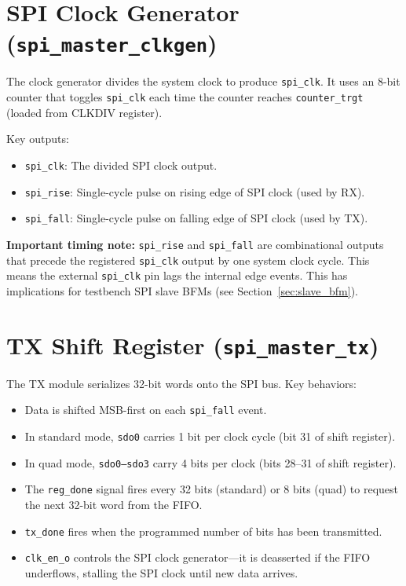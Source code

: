 \section{SPI Clock Generator (\texttt{spi\_master\_clkgen})}

The clock generator divides the system clock to produce \texttt{spi\_clk}. It uses an 8-bit
counter that toggles \texttt{spi\_clk} each time the counter reaches \texttt{counter\_trgt}
(loaded from CLKDIV register).

Key outputs:
\begin{itemize}[leftmargin=2em]
  \item \texttt{spi\_clk}: The divided SPI clock output.
  \item \texttt{spi\_rise}: Single-cycle pulse on rising edge of SPI clock (used by RX).
  \item \texttt{spi\_fall}: Single-cycle pulse on falling edge of SPI clock (used by TX).
\end{itemize}

\textbf{Important timing note:} \texttt{spi\_rise} and \texttt{spi\_fall} are combinational outputs
that precede the registered \texttt{spi\_clk} output by one system clock cycle. This means the
external \texttt{spi\_clk} pin lags the internal edge events. This has implications for testbench
SPI slave BFMs (see Section~\ref{sec:slave_bfm}).

\section{TX Shift Register (\texttt{spi\_master\_tx})}

The TX module serializes 32-bit words onto the SPI bus. Key behaviors:
\begin{itemize}[leftmargin=2em]
  \item Data is shifted MSB-first on each \texttt{spi\_fall} event.
  \item In standard mode, \texttt{sdo0} carries 1 bit per clock cycle (bit 31 of shift register).
  \item In quad mode, \texttt{sdo0--sdo3} carry 4 bits per clock (bits 28--31 of shift register).
  \item The \texttt{reg\_done} signal fires every 32 bits (standard) or 8 bits (quad) to request
        the next 32-bit word from the FIFO.
  \item \texttt{tx\_done} fires when the programmed number of bits has been transmitted.
  \item \texttt{clk\_en\_o} controls the SPI clock generator---it is deasserted if the FIFO
        underflows, stalling the SPI clock until new data arrives.
\end{itemize}

